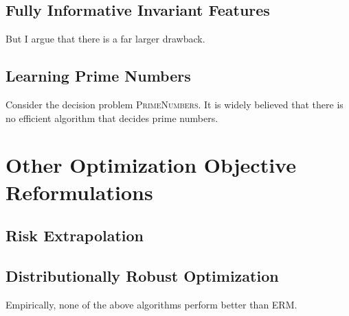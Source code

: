 \subsection{Fully Informative Invariant Features}
But I argue that there is a far larger drawback.
\subsection{Learning Prime Numbers}
Consider the decision problem \textsc{PrimeNumbers}.
It is widely believed that there is no efficient algorithm that decides prime numbers.

\section{Other Optimization Objective Reformulations}
\subsection{Risk Extrapolation}
\subsection{Distributionally Robust Optimization}


Empirically, none of the above algorithms perform better than ERM.
